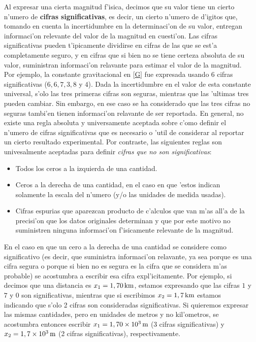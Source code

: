 \documentclass[letterpaper,11pt]{report}
\begin{document}
Al expresar una cierta magnitud f'isica, decimos que su valor tiene un cierto n'umero de \textbf{cifras significativas}, es decir, un cierto n'umero de d'igitos que, tomando en cuenta la incertidumbre en la determinaci'on de su valor, entregan informaci'on relevante del valor de la magnitud en cuesti'on. Las cifras significativas pueden t'ipicamente dividirse en cifras de las que se est'a completamente seguro, y en cifras que si bien no se tiene certeza absoluta de su valor, suministran informaci'on relavante para estimar el valor de la magnitud. Por ejemplo, la constante gravitacional en \eqref{G} fue expresada usando 6 cifras significativas ($6, 6, 7, 3, 8$ y $4$). Dada la incertidumbre en el valor de esta constante universal, s'olo las tres primeras cifras son seguras, mientras que las 'ultimas tres pueden cambiar. Sin embargo, en ese caso se ha considerado que las tres cifras no seguras tambi'en tienen informaci'on relavante de ser reportada. En general, no existe una regla absoluta y universamente aceptada sobre c'omo definir el n'umero de cifras significativas que es necesario o 'util de considerar al reportar un cierto resultado experimental. Por contraste, las siguientes reglas son univesalmente aceptadas para definir \textit{cifras que no son significativas}:
\begin{itemize}
\item Todos los ceros a la izquierda de una cantidad.
\item Ceros a la derecha de una cantidad, en el caso en que 'estos indican solamente la escala del n'umero (y/o las unidades de medida usadas).
\item Cifras espurias que aparezcan producto de c'alculos que van m'as all'a de la precisi'on que los datos originales determinan y que por este motivo no suministren ninguna informaci'on f'isicamente relevante de la magnitud.
\end{itemize}

En el caso en que un cero a la derecha de una cantidad se considere como significativo (es decir, que suministra informaci'on relavante, ya sea porque es una cifra segura o porque si bien no es segura es la cifra que se considera m'as probable) se acostumbra a escribir esa cifra expl'icitamente. Por ejemplo, si decimos que una distancia es $x_1=1,70{\rm\, km}$, estamos expresando que las cifras $1$ y $7$ y $0$ son significativas, mientras que si escribimos $x_2=1,7{\rm\, km}$ estamos indicando que s'olo 2 cifras son consideradas significativas. Si quieremos expresar las mismas cantidades, pero en unidades de metros y no kil'ometros, se acostumbra entonces escribir $x_1=1,70\times 10^3{\rm\, m}$ (3 cifras significativas) y $x_2=1,7\times 10^3{\rm\, m}$ (2 cifras significativas), respectivamente.
\end{document}
